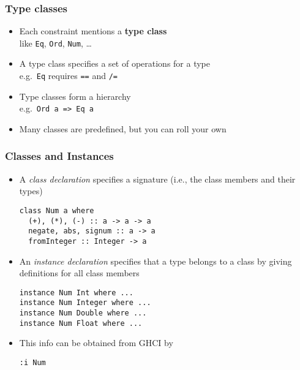 \documentclass{beamer}
\begin{document}
\begin{frame}[fragile]
  \frametitle{Type classes}
  \begin{itemize}
  \item Each constraint mentions a \textbf{type class}\\
    like \texttt{Eq}, \texttt{Ord}, \texttt{Num}, \dots
  \item A type class specifies a set of operations for a type\\
    e.g.\ \texttt{Eq} requires \texttt{==} and \texttt{/=}
  \item Type classes form a hierarchy\\
    e.g.\ \texttt{Ord a => Eq a}
  \item Many classes are predefined, but you can roll your own
  \end{itemize}
\end{frame}
\begin{frame}[fragile]
  \frametitle{Classes and Instances}
  \begin{itemize}
  \item A \emph{class declaration} specifies a signature (i.e., the class members and their types)
\begin{lstlisting}
class Num a where
  (+), (*), (-) :: a -> a -> a
  negate, abs, signum :: a -> a
  fromInteger :: Integer -> a
\end{lstlisting}
  \item An \emph{instance declaration} specifies that a type belongs to a class by giving definitions for all class members
\begin{lstlisting}
instance Num Int where ...
instance Num Integer where ...
instance Num Double where ...
instance Num Float where ...
\end{lstlisting}
  \item This info can be obtained from GHCI by
\begin{lstlisting}
:i Num 
\end{lstlisting}
  \end{itemize}
\end{frame}
\end{document}

